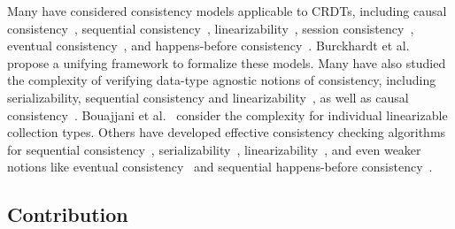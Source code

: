 Many have considered consistency models applicable to CRDTs, including causal consistency~\cite{DBLP:journals/cacm/Lamport78}, sequential consistency~\cite{DBLP:journals/tc/Lamport79}, linearizability~\cite{DBLP:journals/toplas/HerlihyW90}, session consistency~\cite{DBLP:conf/pdis/TerryDPSTW94}, eventual consistency~\cite{DBLP:conf/sosp/TerryTPDSH95}, and happens-before consistency~\cite{DBLP:conf/popl/MansonPA05}. Burckhardt et al.~\cite{DBLP:journals/ftpl/Burckhardt14, DBLP:conf/popl/BurckhardtGYZ14} propose a unifying framework to formalize these models. Many have also studied the complexity of verifying data-type agnostic notions of consistency, including serializability, sequential consistency and linearizability~\cite{DBLP:journals/jacm/Papadimitriou79b, DBLP:journals/siamcomp/GibbonsK97, DBLP:journals/iandc/AlurMP00, DBLP:conf/spaa/BinghamCH03, DBLP:conf/cav/FarzanM08, DBLP:conf/esop/BouajjaniEEH13, DBLP:conf/netys/Hamza15}, as well as causal consistency~\cite{DBLP:conf/popl/BouajjaniEGH17}.
Bouajjani et al.~\cite{DBLP:journals/iandc/BouajjaniEEH18, DBLP:journals/pacmpl/EmmiE18} consider the complexity for individual linearizable collection types. Others have developed effective consistency checking algorithms for sequential consistency~\cite{DBLP:conf/cav/HenzingerQR99a, DBLP:journals/tpds/Qadeer03, DBLP:conf/cav/BinghamCHQZ04, DBLP:conf/pldi/BurckhardtAM07}, serializability~\cite{DBLP:conf/fmcad/0002OPTZ07, DBLP:conf/cav/FarzanM08, DBLP:conf/pldi/GuerraouiHJS08, DBLP:conf/pldi/EmmiMM10}, linearizability~\cite{DBLP:journals/jpdc/WingG93, DBLP:conf/pldi/BurckhardtDMT10, DBLP:conf/pldi/EmmiEH15, DBLP:journals/concurrency/Lowe17}, and even weaker notions like eventual consistency~\cite{DBLP:conf/popl/BouajjaniEH14} and sequential happens-before consistency~\cite{DBLP:conf/cav/EmmiE18, DBLP:journals/pacmpl/EmmiE19}.


\subsection{Contribution}

